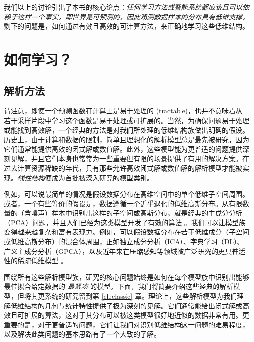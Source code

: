 \documentclass[../../book-main.tex]{subfiles}
\begin{document}
我们以上的讨论引出了本书的核心论点：{\em 任何学习方法或智能系统都应该且可以依赖于这样一个事实，即世界是可预测的，因此观测数据样本的分布具有低维支撑。} 剩下的问题是，如何通过有效且高效的可计算方法，来正确地学习这些低维结构。

\section{如何学习？}


\subsection{解析方法}
\label{sec:analytical}
请注意，即使一个预测函数在计算上是易于处理的 (tractable)，也并不意味着从若干采样片段中学习这个函数是易于处理或可扩展的。当然，为确保问题易于处理或能找到高效解，一个经典的方法是对我们所处理的低维结构族做出明确的假设。历史上，由于计算和数据的限制，简单且理想化的解析模型总是最先被研究，因为它们通常能提供高效的闭式解或数值解。此外，这些模型能为更普适的问题提供深刻见解，并且它们本身也常常为一些重要但有限的场景提供了有用的解决方案。在过去计算资源稀缺的年代，只有那些允许高效闭式解或数值解的解析模型才能被实现。{\em 线性结构}便成为首批被深入研究的模型类别。

例如，可以说最简单的情况是假设数据分布在高维空间中的单个低维子空间周围。或者，一个有些等价的假设是，数据遵循一个近乎退化的低维高斯分布。从有限数量的（含噪声）样本中识别出这样的子空间或高斯分布，就是经典的主成分分析（PCA）问题，并且人们已经为这类模型开发了有效的算法 \cite{JolliffeI2002}。我们可以让模型族变得越来越复杂和富有表现力。例如，可以假设数据分布在若干低维成分（子空间或低维高斯分布）的混合体周围，正如独立成分分析（ICA）\cite{Ans-1985}、字典学习（DL）、广义主成分分析（GPCA）\cite{Vidal-GPCA}，以及近年来在压缩感知等领域被广泛研究的更具普适性的稀疏低维模型 \cite{Wright-Ma-2022}。

围绕所有这些解析模型族，研究的核心问题始终是如何在每个模型族中识别出能够最佳拟合给定数据的 {\em 最紧凑} 的模型。下面，我们将简要介绍这些经典的解析模型，但将其更系统的研究留到第 \ref{ch:classic} 章。理论上，这些解析模型为我们理解低维结构的几何与统计特性提供了极为深刻的见解。它们通常能给出闭式解或高效且可扩展的算法，这对于其分布可以被这类模型很好地近似的数据非常有用。更重要的是，对于更普适的问题，它们让我们对识别低维结构这一问题的难易程度，以及解决此类问题的基本思路有了一个大致的了解。
\end{document}
